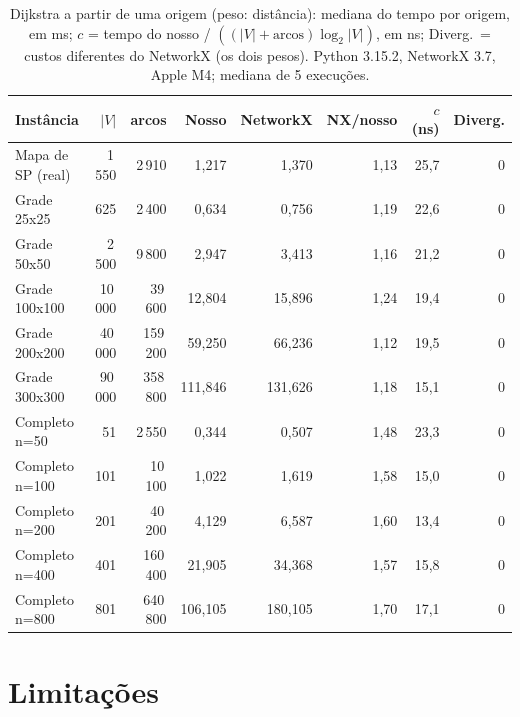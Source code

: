\documentclass[12pt]{article}
\begin{document}
\begin{table}[htbp]
\centering
\caption{Dijkstra a partir de uma origem (peso: distância): mediana do tempo por origem, em ms; $c$ = tempo do nosso / $((|V| + \text{arcos}) \log_2 |V|)$, em ns; Diverg.\ = custos diferentes do NetworkX (os dois pesos). Python 3.15.2, NetworkX 3.7, Apple M4; mediana de 5 execuções.}
\label{tab:dijkstra-networkx}
\small
\setlength{\tabcolsep}{4pt}
\begin{tabular}{lrrrrrrr}
\toprule
Instância & $|V|$ & arcos & Nosso & NetworkX & NX/nosso & $c$ (ns) & Diverg. \\
\midrule
Mapa de SP (real) & 1\,550 & 2\,910 & 1{,}217 & 1{,}370 & 1{,}13 & 25{,}7 & 0 \\
\midrule
Grade 25x25 & 625 & 2\,400 & 0{,}634 & 0{,}756 & 1{,}19 & 22{,}6 & 0 \\
Grade 50x50 & 2\,500 & 9\,800 & 2{,}947 & 3{,}413 & 1{,}16 & 21{,}2 & 0 \\
Grade 100x100 & 10\,000 & 39\,600 & 12{,}804 & 15{,}896 & 1{,}24 & 19{,}4 & 0 \\
Grade 200x200 & 40\,000 & 159\,200 & 59{,}250 & 66{,}236 & 1{,}12 & 19{,}5 & 0 \\
Grade 300x300 & 90\,000 & 358\,800 & 111{,}846 & 131{,}626 & 1{,}18 & 15{,}1 & 0 \\
\midrule
Completo n=50 & 51 & 2\,550 & 0{,}344 & 0{,}507 & 1{,}48 & 23{,}3 & 0 \\
Completo n=100 & 101 & 10\,100 & 1{,}022 & 1{,}619 & 1{,}58 & 15{,}0 & 0 \\
Completo n=200 & 201 & 40\,200 & 4{,}129 & 6{,}587 & 1{,}60 & 13{,}4 & 0 \\
Completo n=400 & 401 & 160\,400 & 21{,}905 & 34{,}368 & 1{,}57 & 15{,}8 & 0 \\
Completo n=800 & 801 & 640\,800 & 106{,}105 & 180{,}105 & 1{,}70 & 17{,}1 & 0 \\
\bottomrule
\end{tabular}
\end{table}

\section{Limitações}\label{sec:limitacoes}
\end{document}
